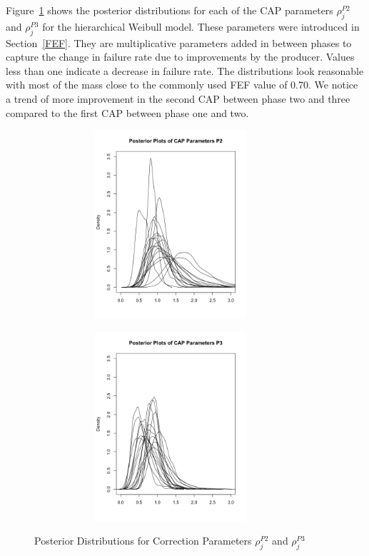 \documentclass[12pt]{article}
\begin{document}
Figure~\ref{fig:CAP} shows the posterior distributions for each of the CAP parameters $\rho_{j}^{P2}$ and $\rho_{j}^{P3}$ for the hierarchical Weibull model.  These parameters were introduced in Section~\ref{FEF}.  They are multiplicative parameters added in between phases to capture the change in failure rate due to improvements by the producer.  Values less than one indicate a decrease in failure rate.  The distributions look reasonable with most of the mass close to the commonly used FEF value of 0.70.  We notice a trend of more improvement in the second CAP between phase two and three compared to the first CAP between phase one and two.

\begin{figure}[ht]
\centering
\begin{subfigure}{.5\textwidth}
  \centering
      \includegraphics[width=8cm, height=7cm]{CAP2}
\end{subfigure}%
\begin{subfigure}{.5\textwidth}
  \center
  	\includegraphics[width=8cm, height=7cm]{CAP3}
\end{subfigure}
\caption{Posterior Distributions for Correction Parameters $\rho_{j}^{P2}$ and $\rho_{j}^{P3}$}
\label{fig:CAP}
\end{figure}
\end{document}

